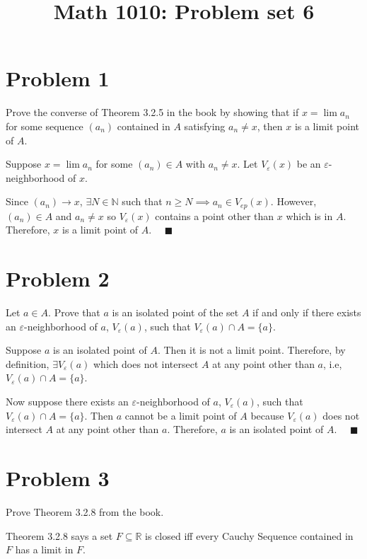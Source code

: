\documentclass[12pt]{article}
\title{Math 1010: Problem set 6}
\date{}
\newcommand{\R}{\mathbb{R}}
\newcommand{\N}{\mathbb{N}}
\newcommand{\qed}{\quad \blacksquare}
\newcommand{\ep}{\varepsilon}
\begin{document}
\maketitle
\vspace*{-1in}

\section*{Problem 1 }
Prove the converse of Theorem 3.2.5 in the book by showing that if $x=\lim a_n$ for some sequence $(a_n)$ contained in $A$ satisfying $a_n\neq x$, then $x$ is a limit point of $A$.

    \color{blue}
        Suppose $x = \lim a_n$ for some $(a_n) \in A$ with $a_n \neq x$. Let $V_{\ep}(x)$ be an $\ep$-neighborhood of $x$. 

        Since $(a_n) \to x$, $\exists N \in \N$ such that $n \geq N \implies a_n \in V_{ep}(x)$. However, $(a_n) \in A$ and $a_n \neq x$ so $V_{\ep}(x)$ contains a point other than $x$ which is in $A$. Therefore, $x$ is a limit point of $A$. $\qed$
    \color{black}


\pagebreak
\section*{Problem 2}
Let $a\in A$. Prove that $a$ is an isolated point of the set $A$ if and only if there exists an $\varepsilon$-neighborhood of $a$, $V_\varepsilon(a)$, such that $V_\varepsilon(a)\cap A=\{a\}$.

        \color{blue}
            Suppose $a$ is an isolated point of $A$. Then it is not a limit point. Therefore, by definition, $\exists V_{\ep}(a)$ which does not intersect $A$ at any point other than $a$, i.e, $V_{\ep}(a) \cap A = \{a\}$.

            Now suppose there exists an $\varepsilon$-neighborhood of $a$, $V_\varepsilon(a)$, such that $V_\varepsilon(a)\cap A=\{a\}$. Then $a$ cannot be a limit point of $A$ because $V_{\ep}(a)$ does not intersect $A$ at any point other than $a$. Therefore, $a$ is an isolated point of $A$. $\qed$
        \color{black}

\pagebreak
\section*{Problem 3 }
Prove Theorem 3.2.8 from the book.

    \color{blue}
        Theorem 3.2.8 says a set $F \subseteq \R$ is closed iff every Cauchy Sequence contained in $F$ has a limit in $F$.
\end{document}
